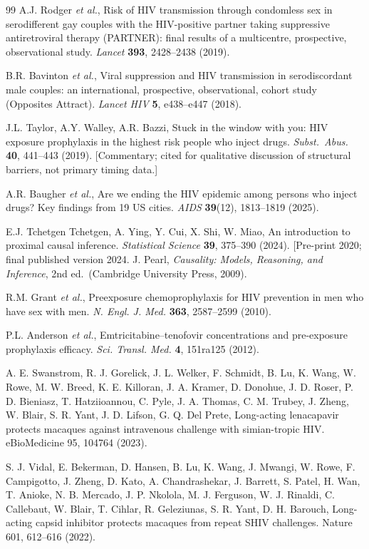 \documentclass[10pt,letterpaper]{article}
\theoremstyle{definition}
\theoremstyle{remark}
\begin{document}
\begin{thebibliography}{99}
A.J. Rodger \textit{et al.}, Risk of HIV transmission through condomless sex in serodifferent gay couples with the HIV-positive partner taking suppressive antiretroviral therapy (PARTNER): final results of a multicentre, prospective, observational study. \textit{Lancet} \textbf{393}, 2428--2438 (2019).

B.R. Bavinton \textit{et al.}, Viral suppression and HIV transmission in serodiscordant male couples: an international, prospective, observational, cohort study (Opposites Attract). \textit{Lancet HIV} \textbf{5}, e438--e447 (2018).

J.L. Taylor, A.Y. Walley, A.R. Bazzi, Stuck in the window with you: HIV exposure prophylaxis in the highest risk people who inject drugs. \textit{Subst.\ Abus.} \textbf{40}, 441--443 (2019). [Commentary; cited for qualitative discussion of structural barriers, not primary timing data.]

A.R. Baugher \textit{et al.}, Are we ending the HIV epidemic among persons who inject drugs? Key findings from 19 US cities. \textit{AIDS} \textbf{39}(12), 1813--1819 (2025). 

E.J. Tchetgen Tchetgen, A. Ying, Y. Cui, X. Shi, W. Miao, An introduction to proximal causal inference. \textit{Statistical Science} \textbf{39}, 375--390 (2024). [Pre-print 2020; final published version 2024.
J. Pearl, \textit{Causality: Models, Reasoning, and Inference}, 2nd ed.\ (Cambridge University Press, 2009).

R.M. Grant \textit{et al.}, Preexposure chemoprophylaxis for HIV prevention in men who have sex with men. \textit{N. Engl. J. Med.} \textbf{363}, 2587--2599 (2010).

P.L. Anderson \textit{et al.}, Emtricitabine--tenofovir concentrations and pre-exposure prophylaxis efficacy. \textit{Sci. Transl. Med.} \textbf{4}, 151ra125 (2012).

A. E. Swanstrom, R. J. Gorelick, J. L. Welker, F. Schmidt, B. Lu, K. Wang, W. Rowe, M. W. Breed, K. E. Killoran, J. A. Kramer, D. Donohue, J. D. Roser, P. D. Bieniasz, T. Hatziioannou, C. Pyle, J. A. Thomas, C. M. Trubey, J. Zheng, W. Blair, S. R. Yant, J. D. Lifson, G. Q. Del Prete, Long-acting lenacapavir protects macaques against intravenous challenge with simian-tropic HIV. eBioMedicine 95, 104764 (2023).

S. J. Vidal, E. Bekerman, D. Hansen, B. Lu, K. Wang, J. Mwangi, W. Rowe, F. Campigotto, J. Zheng, D. Kato, A. Chandrashekar, J. Barrett, S. Patel, H. Wan, T. Anioke, N. B. Mercado, J. P. Nkolola, M. J. Ferguson, W. J. Rinaldi, C. Callebaut, W. Blair, T. Cihlar, R. Geleziunas, S. R. Yant, D. H. Barouch, Long-acting capsid inhibitor protects macaques from repeat SHIV challenges. Nature 601, 612–616 (2022).


\end{thebibliography}
\end{document}
